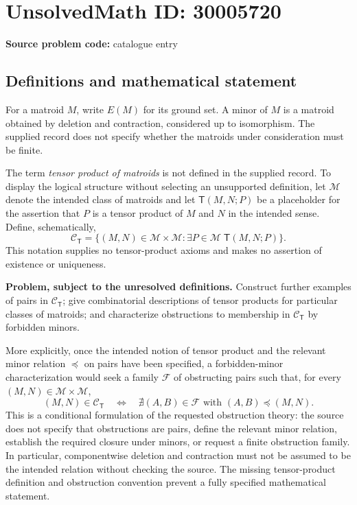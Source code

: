 \documentclass[11pt]{article}
\begin{document}
\section*{UnsolvedMath ID: 30005720}
\textbf{Source problem code:} catalogue entry
\subsection{Definitions and mathematical statement}
For a matroid \(M\), write \(E(M)\) for its ground set. A minor of \(M\) is a matroid obtained by deletion and contraction, considered up to isomorphism. The supplied record does not specify whether the matroids under consideration must be finite.

The term \emph{tensor product of matroids} is not defined in the supplied record. To display the logical structure without selecting an unsupported definition, let \(\mathcal M\) denote the intended class of matroids and let \(\mathsf T(M,N;P)\) be a placeholder for the assertion that \(P\) is a tensor product of \(M\) and \(N\) in the intended sense. Define, schematically,
\[
\mathcal C_{\mathsf T}
 =\bigl\{(M,N)\in\mathcal M\times\mathcal M:
       \exists P\in\mathcal M\;\mathsf T(M,N;P)\bigr\}.
\]
This notation supplies no tensor-product axioms and makes no assertion of existence or uniqueness.

\textbf{Problem, subject to the unresolved definitions.} Construct further examples of pairs in \(\mathcal C_{\mathsf T}\); give combinatorial descriptions of tensor products for particular classes of matroids; and characterize obstructions to membership in \(\mathcal C_{\mathsf T}\) by forbidden minors.

More explicitly, once the intended notion of tensor product and the relevant minor relation \(\preceq\) on pairs have been specified, a forbidden-minor characterization would seek a family \(\mathcal F\) of obstructing pairs such that, for every \((M,N)\in\mathcal M\times\mathcal M\),
\[
(M,N)\in\mathcal C_{\mathsf T}
\quad\Longleftrightarrow\quad
\nexists (A,B)\in\mathcal F\text{ with }(A,B)\preceq(M,N).
\]
This is a conditional formulation of the requested obstruction theory: the source does not specify that obstructions are pairs, define the relevant minor relation, establish the required closure under minors, or request a finite obstruction family. In particular, componentwise deletion and contraction must not be assumed to be the intended relation without checking the source. The missing tensor-product definition and obstruction convention prevent a fully specified mathematical statement.
\end{document}
